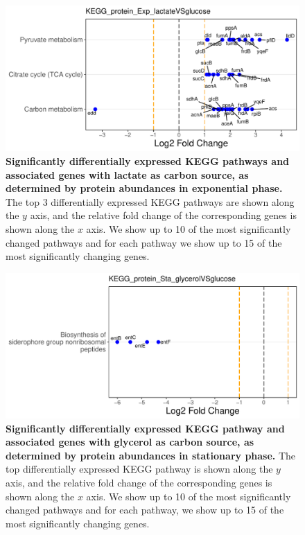 \documentclass[a4paper]{article}
\begin{document}
\clearpage
\begin{figure}
	\includegraphics[width=1.0\textwidth]{../../d_figures/KEGG05_protein_Exp_lactateVSglucose_withTitle.pdf}
	\caption[Significantly differentially expressed KEGG pathways for protein samples in exponential phase tested for lactate against glucose]
	{\textbf{Significantly differentially expressed KEGG pathways and associated genes with lactate as carbon source, as determined by protein abundances in exponential phase.} The top 3 differentially expressed KEGG pathways are shown along the $y$ axis, and the relative fold change of the corresponding genes is shown along the $x$ axis. We show up to 10 of the most significantly changed pathways and for each pathway we show up to 15 of the most significantly changing genes.}
\end{figure}

\clearpage
\begin{figure}
	\includegraphics[width=1.0\textwidth]{../../d_figures/KEGG06_protein_Sta_glycerolVSglucose_withTitle.pdf}
	\caption[Significantly differentially expressed KEGG pathway for protein samples in stationary phase tested for glycerol against glucose]
	{\textbf{Significantly differentially expressed KEGG pathway and associated genes with glycerol as carbon source, as determined by protein abundances in stationary phase.} The top differentially expressed KEGG pathway is shown along the $y$ axis, and the relative fold change of the corresponding genes is shown along the $x$ axis. We show up to 10 of the most significantly changed pathways and for each pathway, we show up to 15 of the most significantly changing genes.}
\end{figure}
\end{document}
